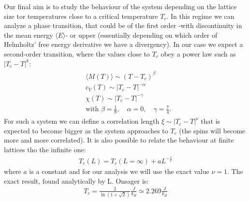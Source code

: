 \documentclass[%
 reprint,
 amsmath,amssymb,
 aps,
]{revtex4-1}
\theoremstyle{plain}
\theoremstyle{definition}
\theoremstyle{plain}
\newcommand{\mean}[1]{\langle #1\rangle}
\begin{document}
	Our final aim is to study the behaviour of the system depending on the lattice size tor temperatures close to a critical temperature $T_c$. In this regime we can analyze a phase transition, that could be of the first order -with discontinuity in the mean energy $\mean{E}$- or upper (essentially depending on which order of Helmholtz' free energy derivative we have a divergency). In our case we expect a second-order transition, where the values close to $T_c$ obey a power law such as $|T_c-T|^{k}$:
	\begin{align*}
	\begin{split}
		&\mean{M(T)}\sim(T-T_c)^\beta\\
		&c_V(T)\sim|T_c-T|^{-\alpha}\\
		&\chi(T)\sim|T_c-T|^{-\gamma}\\
		&\text{with }\beta=\frac{1}{8},\quad\alpha=0,\quad\gamma=\frac{7}{4}.
	\end{split}
	\end{align*}
	 For such a system we can define a correlation length $\xi\sim|T_c-T|^\nu$ that is expected to become bigger as the system approaches to $T_c$ (the spins will become more and more correlated). 
	 It is also possible to relate the behaviour at finite lattices tho the infinite one:
	 \begin{align}
		 \label{critictemp}
		 T_c(L) = T_c(L=\infty) + aL^{-\frac{1}{\nu}}
	 \end{align} 
	 where $a$ is a constant and for our analysis we will use the exact value $\nu=1$. The exact result, found analytically by L. Onsager \cite{compnotes} is:
	 \begin{align}
		 T_c= \frac{2}{\ln(1+\sqrt{2})}\frac{J}{k_B}\simeq 2.269\frac{J}{k_B}
	 \end{align}
	
\end{document}
